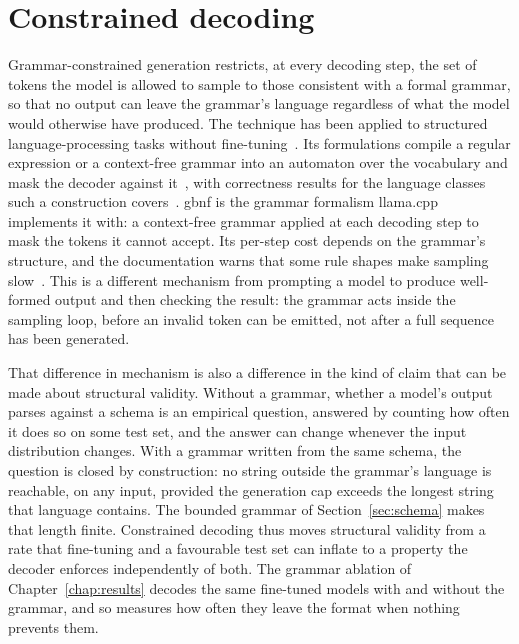 \section{Constrained decoding}
\label{sec:constrained-decoding}
Grammar-constrained generation restricts, at every decoding step, the set of tokens the model is
allowed to sample to those consistent with a formal grammar, so that no output can leave the
grammar's language regardless of what the model would otherwise have produced. The technique has
been applied to structured language-processing tasks without fine-tuning~\cite{geng2023}. Its
formulations compile a regular expression or a context-free grammar into an automaton over the
vocabulary and mask the decoder against it~\cite{willard2023,koo2024}, with correctness results
for the language classes such a construction covers~\cite{koo2024}. \Gls{gbnf} is the grammar
formalism llama.cpp implements it with: a context-free grammar applied at each decoding step to
mask the tokens it cannot accept. Its per-step cost depends on the grammar's
structure, and the documentation warns that some rule shapes make sampling slow~\cite{llamacpp}.
This is a different mechanism from prompting a model to produce well-formed output and then
checking the result: the grammar acts inside the sampling loop, before an invalid token can be
emitted, not after a full sequence has been generated.

That difference in mechanism is also a difference in the kind of claim that can be made about
structural validity. Without a grammar, whether a model's output parses against a schema is an
empirical question, answered by counting how often it does so on some test set, and the answer
can change whenever the input distribution changes. With a grammar written from the same schema,
the question is closed by construction: no string outside the grammar's language is reachable, on
any input, provided the generation cap exceeds the longest string that language contains. The
bounded grammar of Section~\ref{sec:schema} makes that length finite. Constrained decoding thus
moves structural validity from a rate that fine-tuning and a favourable test set can inflate to a
property the decoder enforces independently of both. The grammar ablation of
Chapter~\ref{chap:results} decodes the same fine-tuned models with and without the grammar, and so
measures how often they leave the format when nothing prevents them.

